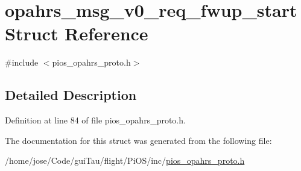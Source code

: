 \hypertarget{structopahrs__msg__v0__req__fwup__start}{\section{opahrs\-\_\-msg\-\_\-v0\-\_\-req\-\_\-fwup\-\_\-start Struct Reference}
\label{structopahrs__msg__v0__req__fwup__start}
}


{\ttfamily \#include $<$pios\-\_\-opahrs\-\_\-proto.\-h$>$}



\subsection{Detailed Description}


Definition at line 84 of file pios\-\_\-opahrs\-\_\-proto.\-h.



The documentation for this struct was generated from the following file\-:\begin{DoxyCompactItemize}
\item 
/home/jose/\-Code/gui\-Tau/flight/\-Pi\-O\-S/inc/\hyperlink{pios__opahrs__proto_8h}{pios\-\_\-opahrs\-\_\-proto.\-h}\end{DoxyCompactItemize}
